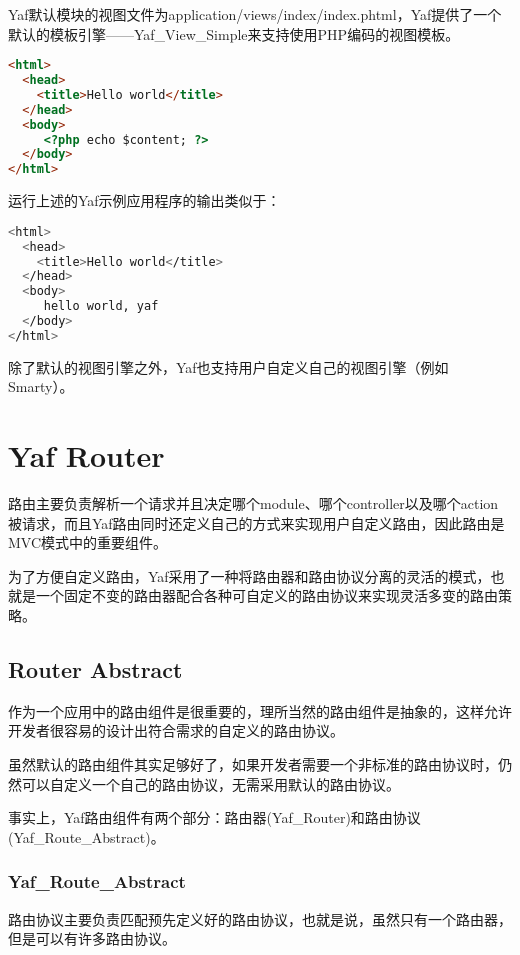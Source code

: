 Yaf默认模块的视图文件为application/views/index/index.phtml，Yaf提供了一个默认的模板引擎——Yaf\_View\_Simple来支持使用PHP编码的视图模板。

\begin{lstlisting}[language=HTML]
<html>
  <head>
    <title>Hello world</title>
  </head>
  <body>
     <?php echo $content; ?>
  </body>
</html>
\end{lstlisting}

运行上述的Yaf示例应用程序的输出类似于：


\begin{lstlisting}[language=bash]
<html>
  <head>
    <title>Hello world</title>
  </head>
  <body>
     hello world, yaf
  </body>
</html>
\end{lstlisting}

除了默认的视图引擎之外，Yaf也支持用户自定义自己的视图引擎（例如Smarty）。

\chapter{Yaf Router}

路由主要负责解析一个请求并且决定哪个module、哪个controller以及哪个action被请求，而且Yaf路由同时还定义自己的方式来实现用户自定义路由，因此路由是MVC模式中的重要组件。

为了方便自定义路由，Yaf采用了一种将路由器和路由协议分离的灵活的模式，也就是一个固定不变的路由器配合各种可自定义的路由协议来实现灵活多变的路由策略。

\section{Router Abstract}

作为一个应用中的路由组件是很重要的，理所当然的路由组件是抽象的，这样允许开发者很容易的设计出符合需求的自定义的路由协议。

虽然默认的路由组件其实足够好了，如果开发者需要一个非标准的路由协议时，仍然可以自定义一个自己的路由协议，无需采用默认的路由协议。

事实上，Yaf路由组件有两个部分：路由器(Yaf\_Router)和路由协议(Yaf\_Route\_Abstract)。

\subsection{Yaf\_Route\_Abstract}


路由协议主要负责匹配预先定义好的路由协议，也就是说，虽然只有一个路由器，但是可以有许多路由协议。

